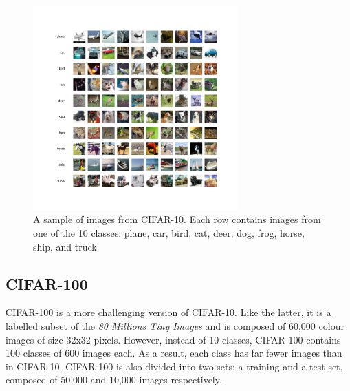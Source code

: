 \begin{figure}[ht!]
  \centering
  \includegraphics[width=0.7\textwidth]{chapter_dlo/assets/cifar-10_example.png}
  \caption{ A sample of images from CIFAR-10. Each row contains images from one
    of the 10 classes: plane, car, bird, cat, deer, dog, frog, horse, ship, and
    truck}
  \label{fig:intro:cifar10_examples}
\end{figure}


\subsection{CIFAR-100}

CIFAR-100 \cite{CIFARdataset} is a more challenging
version of CIFAR-10. Like the latter, it is a labelled subset of the \emph{80
  Millions Tiny Images} and  is composed of 60,000 colour images of size 32x32
pixels. However, instead of 10 classes, CIFAR-100 contains 100 classes of 600
images each. As a result, each class has far fewer images than in CIFAR-10.
CIFAR-100 is also divided into two sets: a training and a test set, composed of
50,000 and 10,000 images respectively.\\

